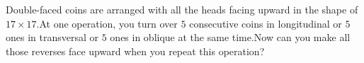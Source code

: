 Double-faced coins are arranged with all the heads facing upward in the shape of $17\times17.$At one operation, you turn over $5$ consecutive coins in longitudinal or $5$ ones in transversal or $5$ ones in oblique at the same time.Now can you make all those reverses face upward when you repeat this operation?